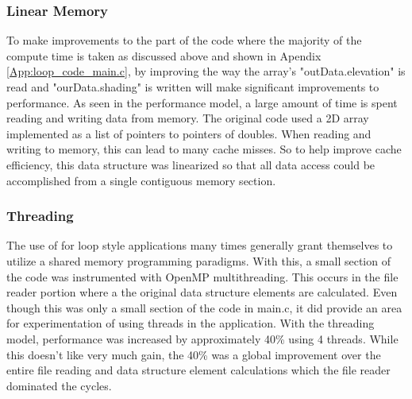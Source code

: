 \documentclass[]{article}%
\begin{document}
\subsubsection{Linear Memory}

To make improvements to the part of the code where the majority of the compute time is taken as discussed above and shown in Apendix \ref{App:loop_code_main.c}, by improving the way the array's "outData.elevation" is read and "ourData.shading" is written will make significant improvements to performance. As seen in the performance model, a large amount of time is spent reading and writing data from memory.  The original code used a 2D array implemented as a list of pointers to pointers of doubles.  When reading and writing to memory, this can lead to many cache misses.  So to help improve cache efficiency, this data structure was linearized so that all data access could be accomplished from a single contiguous memory section.

%
%									
%									
%									
%									
%									
%									

\subsubsection{Threading}

The use of for loop style applications many times generally grant themselves to utilize a shared memory programming paradigms. With this, a small section of the code was instrumented with OpenMP multithreading. This occurs in the file reader portion where a the original data structure elements are calculated. Even though this was only a small section of the code in main.c, it did provide an area for experimentation of using threads in the application. With the threading model, performance was increased by approximately 40\% using 4 threads. While this doesn't like very much gain, the 40\% was a global improvement over the entire file reading and data structure element calculations which the file reader dominated the cycles.
\end{document}
